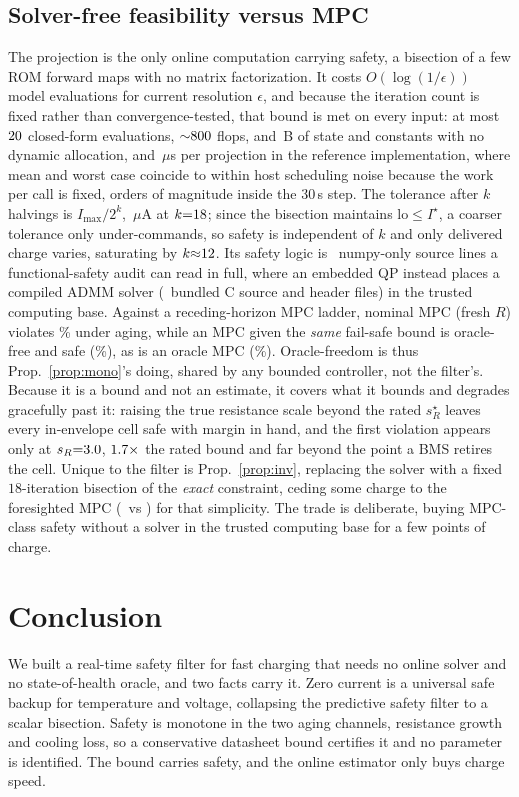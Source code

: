 \documentclass[conference]{IEEEtran}
\newcommand{\SI}[2]{#1\,#2}
\begin{document}
\subsection{Solver-free feasibility versus MPC}\label{sec:solver}
The projection is the only online computation carrying safety, a bisection of a few ROM forward maps
with no matrix factorization. It costs $O(\log(1/\epsilon))$ model evaluations for current resolution
$\epsilon$, and because the iteration count is fixed rather than convergence-tested, that bound is met
on every input: at most $20$ closed-form evaluations, ${\sim}800$ flops, and
\SI{\filterMemB}{B} of state and constants with no dynamic allocation, and
\SI{\filterMeanUs}{$\mu$s} per projection in the reference implementation, where mean and worst case
coincide to within host scheduling noise because the work per call is fixed, orders of magnitude
inside the \SI{30}{s} step. The
tolerance after $k$ halvings is $I_{\max}/2^{k}$, \SI{\tolEpsUA}{$\mu$A} at $k{=}18$; since
the bisection maintains $\mathrm{lo}\le I^\star$, a coarser tolerance only under-commands, so safety is
independent of $k$ and only delivered charge varies, saturating by $k{\approx}12$. Its safety
logic is \filterSloc\ numpy-only source lines a functional-safety audit can read in full, where an embedded QP instead places a compiled ADMM solver
(\qpTcbFiles\ bundled C source and header files) in the trusted computing base. Against a receding-horizon MPC ladder,
nominal MPC (fresh $R$) violates \mpcNomViol\% under aging, while an MPC given the \emph{same}
fail-safe bound is oracle-free and safe (\mpcBoundedViol\%), as is an oracle MPC (\mpcOracleViol\%).
Oracle-freedom is thus Prop.~\ref{prop:mono}'s doing, shared by any bounded controller, not the
filter's. Because it is a bound and not an estimate, it covers what it bounds and degrades gracefully
past it: raising the true resistance scale beyond the rated $s_R^\star$ leaves every in-envelope cell
safe with margin in hand, and the first violation appears only at $s_R{=}3.0$,
$1.7\times$ the rated bound and far beyond the point a BMS retires the cell. Unique to the filter is Prop.~\ref{prop:inv}, replacing the solver with a fixed
$18$-iteration bisection of the \emph{exact} constraint, ceding some charge to the foresighted MPC
(\mpcOursSoc\ vs \mpcBoundedSoc) for that simplicity. The trade is deliberate, buying MPC-class safety
without a solver in the trusted computing base for a few points of charge.

\section{Conclusion}
We built a real-time safety filter for fast charging that needs no online solver and no state-of-health
oracle, and two facts carry it. Zero current is a universal safe backup for temperature and voltage,
collapsing the predictive safety filter to a scalar bisection. Safety is monotone in the two aging
channels, resistance growth and cooling loss, so a conservative datasheet bound certifies it and no
parameter is identified. The bound carries safety, and the online estimator only buys charge speed.
\end{document}
